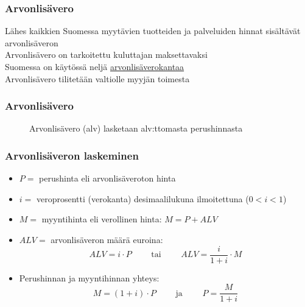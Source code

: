 \documentclass[handout]{beamer}
\newcommand{\pblock}{\\ \vspace{0.5cm}\pause}
\begin{document}
\begin{frame}
\frametitle{Arvonlisävero}
\pause
Lähes kaikkien Suomessa myytävien tuotteiden ja palveluiden hinnat sisältävät arvonlisäveron
\pblock
Arvonlisävero on tarkoitettu kuluttajan maksettavaksi
\pblock
Suomessa on käytössä neljä \href{http://www.veronmaksajat.fi/luvut/tilastot/kulutusverot/arvonlisavero/}{arvonlisäverokantaa}
\pblock
Arvonlisävero tilitetään valtiolle myyjän toimesta
\end{frame}

\begin{frame}
\frametitle{Arvonlisävero}
\pause
\begin{figure}
\caption{Arvonlisävero (alv) lasketaan alv:ttomasta perushinnasta}
\end{figure}
\end{frame}



\begin{frame}
\frametitle{Arvonlisäveron laskeminen}
	\begin{itemize}
		\item \(P =\) perushinta eli arvonlisäveroton hinta
		\item \(i =\) veroprosentti (verokanta) desimaalilukuna ilmoitettuna (\(0 < i < 1\))
		\item \(M =\) myyntihinta eli verollinen hinta: \(M = P + ALV\)
		\item \(ALV =\) arvonlisäveron määrä euroina:
			\[
				ALV = i \cdot P\qquad\text{ tai }\qquad ALV = \frac{i}{1 + i}\cdot M
			\]
		\item Perushinnan ja myyntihinnan yhteys:
			\[
				M = (1 + i) \cdot P \qquad\text{ ja }\qquad P = \frac{M}{1 + i}
			\]
	\end{itemize}
\end{frame}
\end{document}
